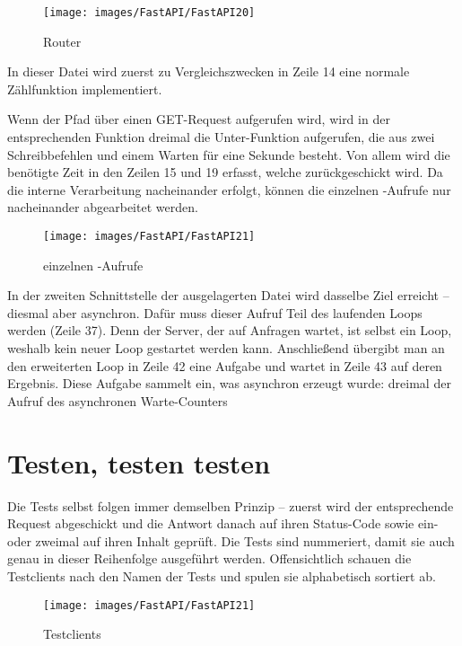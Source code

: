 \begin{figure}
    \texttt{[image: images/FastAPI/FastAPI20]}
    \caption{Router} \label{FastAPI20}
\end{figure}


In dieser Datei wird zuerst zu Vergleichszwecken in Zeile 14 eine normale Zählfunktion implementiert.

Wenn der Pfad  über einen GET-Request aufgerufen wird, wird in der entsprechenden Funktion dreimal die Unter-Funktion aufgerufen, die aus zwei Schreibbefehlen und einem Warten für eine Sekunde besteht. Von allem wird die benötigte Zeit in den Zeilen 15 und 19 erfasst, welche zurückgeschickt wird. Da die interne Verarbeitung nacheinander erfolgt, können die einzelnen -Aufrufe nur nacheinander abgearbeitet werden.

\begin{figure}
    \texttt{[image: images/FastAPI/FastAPI21]}
    \caption{einzelnen -Aufrufe} \label{FastAPI21}
\end{figure}

In der zweiten Schnittstelle der ausgelagerten Datei wird dasselbe Ziel erreicht – diesmal aber asynchron. Dafür muss dieser Aufruf Teil des laufenden Loops werden (Zeile 37). Denn der Server, der auf Anfragen wartet, ist selbst ein Loop, weshalb kein neuer Loop gestartet werden kann. Anschließend übergibt man an den erweiterten Loop in Zeile 42 eine Aufgabe und wartet in Zeile 43 auf deren Ergebnis. Diese Aufgabe sammelt ein, was asynchron erzeugt wurde: dreimal der Aufruf des asynchronen Warte-Counters

\section{Testen, testen testen}

Die Tests selbst folgen immer demselben Prinzip -- zuerst wird der entsprechende Request abgeschickt und die Antwort danach auf ihren Status-Code sowie ein- oder zweimal auf ihren Inhalt geprüft. Die Tests sind nummeriert, damit sie auch genau in dieser Reihenfolge ausgeführt werden. Offensichtlich schauen die Testclients nach den Namen der Tests und spulen sie alphabetisch sortiert ab.

\begin{figure}
    \texttt{[image: images/FastAPI/FastAPI21]}
    \caption{Testclients} \label{FastAPI21}
\end{figure}

